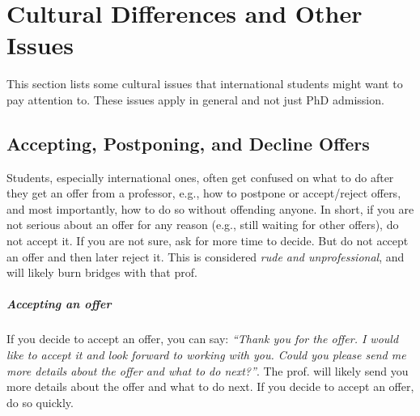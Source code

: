 \documentclass[oneside,11pt]{memoir}
\newenvironment{domesticbox}[1][]{
  \small
  \begin{mydomesticbox}
    {\small \textbf{#1}}
  }{
  \end{mydomesticbox}
}
\begin{document}


\chapter{Cultural Differences and Other Issues}\label{sec:cultural}

This section lists some cultural issues that international students might want to pay attention to. These issues apply in general and not just PhD admission.


\section{Accepting, Postponing, and Decline Offers}\label{sec:accept-postpone-decline}

Students, especially international ones, often get confused on what to do after they get an offer from a professor, e.g., how to postpone or accept/reject offers, and most importantly, how to do so without offending anyone. In short, if you are not serious about an offer for any reason (e.g., still waiting for other offers), do not accept it.
If you are not sure, ask for more time to decide.  But do not accept an offer and then later reject it.  This is considered \emph{rude and unprofessional}, and will likely burn bridges with that prof.

\paragraph{Accepting an offer} If you decide to accept an offer, you can say: \emph{``Thank you for the offer.  I would like to accept it and look forward to working with you.  Could you please send me more details about the offer and what to do next?''}. The prof. will likely send you more details about the offer and what to do next.  If you decide to accept an offer, do so quickly.
\end{document}
